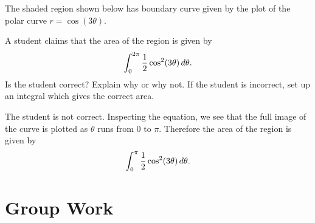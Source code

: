 \documentclass[]{ximera}
\begin{document}
\begin{problem}
The shaded region shown below has boundary curve given by the plot of the polar curve $r = \cos(3\theta)$. 

\begin{image}  
\end{image} 

A student claims that the area of the region is given by 
$$
\int_0^{2\pi} \frac{1}{2} \cos^2(3\theta) \mathop{}\!d \theta.
$$
Is the student correct? Explain why or why not. If the student is incorrect, set up an integral which gives the correct area.

\begin{solution}
The student is not correct. Inspecting the equation, we see that the full image of the curve is plotted as $\theta$ runs from $0$ to $\pi$. Therefore the area of the region is given by 
$$
\int_0^{\pi} \frac{1}{2} \cos^2(3\theta) \mathop{}\!d \theta.
$$
\end{solution}
\end{problem}

\section{Group Work}
\end{document}
